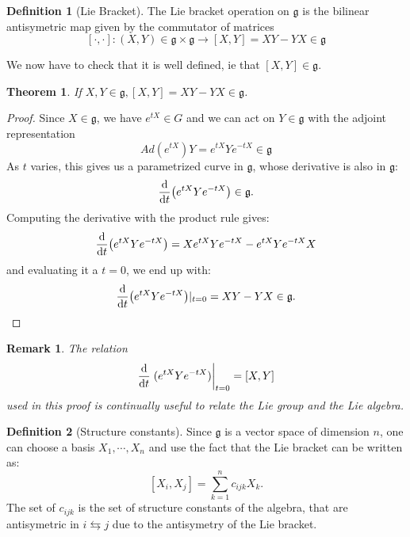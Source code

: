 \documentclass[11pt,a4paper]{article}
\newtheorem{theorem}{Theorem}[section]
\newtheorem*{remark}{Remark}
\theoremstyle{definition}
\newtheorem{definition}{Definition}[section]
\numberwithin{equation}{section}
\begin{document}
\begin{definition}[Lie Bracket]
    The Lie bracket operation on $ \mathfrak{g}$ is the bilinear antisymetric map given by the commutator of matrices
    \begin{equation*}
        \left[\cdot,\cdot\right]:(X,Y)\in \mathfrak{g} \times \mathfrak{g} \rightarrow \left[X,Y\right] = XY -YX \in \mathfrak{g}
    \end{equation*}
\end{definition}
We now have to check that it is well defined, ie that $\left[X,Y\right]\in \mathfrak{g}$.
\begin{theorem}
    If $X,Y \in  \mathfrak{g}, \left[X,Y\right] = XY - YX \in \mathfrak{g}$.
\end{theorem}
\begin{proof}
    Since $X \in \mathfrak{g}$, we have $e^{tX} \in G$ and we can act on $Y \in \mathfrak{g}$ with the adjoint representation
    \begin{equation*}
        Ad(e^{tX})Y = e^{tX}Ye^{-tX} \in \mathfrak{g}
    \end{equation*}
As $t$ varies, this gives us a parametrized curve in $\mathfrak{g}$, whose derivative is also in $\mathfrak{g}$:
\begin{equation*}
    \dv{t} (e^{tX}Ye^{-tX}) \in \mathfrak{g}.
\end{equation*}
Computing the derivative with the product rule gives:
\begin{equation*}
    \dv{t} (e^{tX}Ye^{-tX}) = X e^{tX}Ye^{-tX} - e^{tX}Ye^{-tX}X
\end{equation*}
and evaluating it a $t=0$, we end up with:
\begin{equation*}
    \dv{t} (e^{tX}Ye^{-tX})|_{t=0} = XY - YX \in \mathfrak{g}.
\end{equation*}
\end{proof}
\begin{remark}
    The relation \begin{equation*}
        \dv{t}\eval{(e^{tX}Ye^{-tX})}_{t=0} = \left[X,Y\right]
    \end{equation*}
    used in this proof is continually useful to relate the Lie group and the Lie algebra.
\end{remark}
\begin{definition}[Structure constants]
Since $\mathfrak{g}$ is a vector space of dimension $n$, one can choose a basis $X_1,\cdots,X_n$ and use the fact that the Lie bracket can be written as:
\begin{equation*}
    \left[X_i,X_j\right] = \sum_{k=1}^{n}c_{ijk}X_k.
\end{equation*}
The set of $c_{ijk}$ is the set of structure constants of the algebra, that are antisymetric in $i\leftrightarrows j$ due to the antisymetry of the Lie bracket.   
\end{definition}
\end{document}
